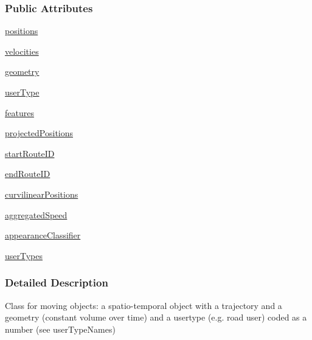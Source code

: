 \subsubsection*{Public Attributes}
\begin{DoxyCompactItemize}
\item 
\hyperlink{classmoving_1_1MovingObject_ab82e899e44b8d3c9a155da278d85b6ea}{positions}
\item 
\hyperlink{classmoving_1_1MovingObject_a705c214e02c9b4dab93d387044437923}{velocities}
\item 
\hyperlink{classmoving_1_1MovingObject_a35f9d997c873b53fa56ec29df5c422e7}{geometry}
\item 
\hyperlink{classmoving_1_1MovingObject_a4f078339d8175f616b3f167c6abf4d2d}{user\-Type}
\item 
\hyperlink{classmoving_1_1MovingObject_a06de9dfc5e3c0161167ea265d23d78a6}{features}
\item 
\hyperlink{classmoving_1_1MovingObject_afc473622764a5640a6b081d484051ae9}{projected\-Positions}
\item 
\hyperlink{classmoving_1_1MovingObject_a23e2a42b45ab136da5b02e9c8341fea1}{start\-Route\-I\-D}
\item 
\hyperlink{classmoving_1_1MovingObject_aad6902d0a0c16a55140b099aaccf6dd3}{end\-Route\-I\-D}
\item 
\hyperlink{classmoving_1_1MovingObject_a9f9ba9bddc49b8cf1bdaafb94a3f4bd5}{curvilinear\-Positions}
\item 
\hyperlink{classmoving_1_1MovingObject_a030eb07d7d94998b860272b4396ce5a4}{aggregated\-Speed}
\item 
\hyperlink{classmoving_1_1MovingObject_aa523c61416384436bff7bfe4d91074fd}{appearance\-Classifier}
\item 
\hyperlink{classmoving_1_1MovingObject_a25b52c7d2f777b62e565aed35a022e5c}{user\-Types}
\end{DoxyCompactItemize}


\subsubsection{Detailed Description}
\begin{DoxyVerb}Class for moving objects: a spatio-temporal object 
with a trajectory and a geometry (constant volume over time) 
and a usertype (e.g. road user) coded as a number (see userTypeNames)
\end{DoxyVerb}
 

